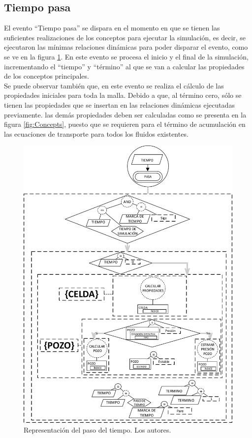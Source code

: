 \subsection{Tiempo pasa}\label{sec:PS_TimePasses}
El evento ``Tiempo pasa'' se dispara en el momento en que se tienen las suficientes realizaciones de los conceptos para ejecutar la simulación, es decir, se ejecutaron las mínimas relaciones dinámicas para poder disparar el evento, como se ve en la figura \ref{fig:TimePasses}. En este evento se procesa el inicio y el final de la simulación, incrementando el ``tiempo'' y ``término'' al que se van a calcular las propiedades de los conceptos principales.\\

Se puede observar también que, en este evento se realiza el cálculo de las propiedades iniciales para toda la malla. Debido a que, al término cero, sólo se tienen las propiedades que se insertan en las relaciones dinámicas ejecutadas previamente. las demás propiedades deben ser calculadas como se presenta en la figura \ref{fig:Concepts}, puesto que se requieren para el término de acumulación en las ecuaciones de transporte para todos los fluidos existentes.

\begin{figure}[h]
	\centering%
	\includegraphics[width=0.7\linewidth]{Fig/TiempoPasa.pdf}%
	\caption[Representación del paso del tiempo.]{Representación del paso del tiempo. Los autores.} \label{fig:TimePasses}
\end{figure}


